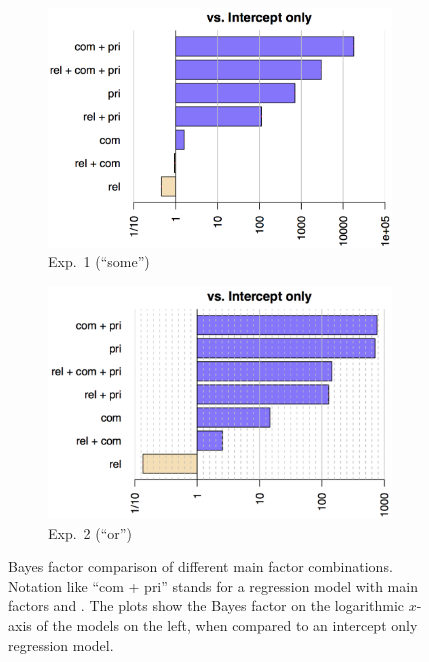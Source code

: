 \documentclass[12pt]{article}
\begin{document}
\begin{figure}
    \centering
    \begin{subfigure}[b]{0.49\textwidth}
      \includegraphics[width = \linewidth]{pics_02/bfsAllExp1_cropped.png}
  \caption{Exp.~1 (``some'')}
  \label{fig:BFsExp1}
    \end{subfigure}
    \hfill
    \begin{subfigure}[b]{0.49\textwidth}
      \centering
      \includegraphics[width = \textwidth]{pics_02/bfsAllExp2_cropped.png}
      \caption{Exp.~2 (``or'')}
      \label{fig:BFsExp2}
    \end{subfigure}
    \caption{Bayes factor comparison of different main factor combinations. Notation like ``com
      + pri'' stands for a regression model with main factors \com and \pri. The plots show the
      Bayes factor on the logarithmic $x$-axis of the models on the left, when compared to an
      intercept only regression model.}\label{fig:BFs}
\end{figure}
\end{document}
